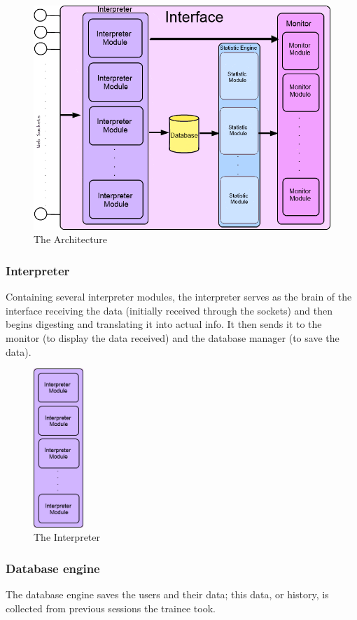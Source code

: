 \documentclass[a4paper]{article}
\begin{document}
\begin{figure}[h!]
\centering
\includegraphics[scale=0.6]{Interface.png}
\caption{The Architecture}
\label{threadsVsSync}
\end{figure}

\subsubsection{Interpreter}
Containing several interpreter modules, the interpreter serves as the brain of the interface receiving the data (initially received through the sockets) and then begins digesting and translating it into actual info. It then sends it to the monitor (to display the data received) and the database manager (to save the data).

\begin{figure}[h!]
\centering
\includegraphics[height=60mm]{Interpreter.png}
\caption{The Interpreter}
\label{threadsVsSync}
\end{figure}

\subsubsection{Database engine}
The database engine saves the users and their data; this data, or history, is collected from previous sessions the trainee took.
\end{document}
